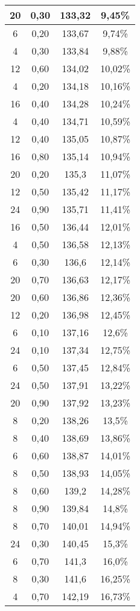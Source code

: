 \begin{center}
\begin{longtable}{|c|c|c|c|}
20 & 0,30 & 133,32 & 9,45\% \\ \hline
6 & 0,20 & 133,67 & 9,74\% \\ \hline
4 & 0,30 & 133,84 & 9,88\% \\ \hline
12 & 0,60 & 134,02 & 10,02\% \\ \hline
4 & 0,20 & 134,18 & 10,16\% \\ \hline
16 & 0,40 & 134,28 & 10,24\% \\ \hline
4 & 0,40 & 134,71 & 10,59\% \\ \hline
12 & 0,40 & 135,05 & 10,87\% \\ \hline
16 & 0,80 & 135,14 & 10,94\% \\ \hline
20 & 0,20 & 135,3 & 11,07\% \\ \hline
12 & 0,50 & 135,42 & 11,17\% \\ \hline
24 & 0,90 & 135,71 & 11,41\% \\ \hline
16 & 0,50 & 136,44 & 12,01\% \\ \hline
4 & 0,50 & 136,58 & 12,13\% \\ \hline
6 & 0,30 & 136,6 & 12,14\% \\ \hline
20 & 0,70 & 136,63 & 12,17\% \\ \hline
20 & 0,60 & 136,86 & 12,36\% \\ \hline
12 & 0,20 & 136,98 & 12,45\% \\ \hline
6 & 0,10 & 137,16 & 12,6\% \\ \hline
24 & 0,10 & 137,34 & 12,75\% \\ \hline
6 & 0,50 & 137,45 & 12,84\% \\ \hline
24 & 0,50 & 137,91 & 13,22\% \\ \hline
20 & 0,90 & 137,92 & 13,23\% \\ \hline
8 & 0,20 & 138,26 & 13,5\% \\ \hline
8 & 0,40 & 138,69 & 13,86\% \\ \hline
6 & 0,60 & 138,87 & 14,01\% \\ \hline
8 & 0,50 & 138,93 & 14,05\% \\ \hline
8 & 0,60 & 139,2 & 14,28\% \\ \hline
8 & 0,90 & 139,84 & 14,8\% \\ \hline
8 & 0,70 & 140,01 & 14,94\% \\ \hline
24 & 0,30 & 140,45 & 15,3\% \\ \hline
6 & 0,70 & 141,3 & 16,0\% \\ \hline
8 & 0,30 & 141,6 & 16,25\% \\ \hline
4 & 0,70 & 142,19 & 16,73\% \\ \hline

\end{longtable}
\end{center}
